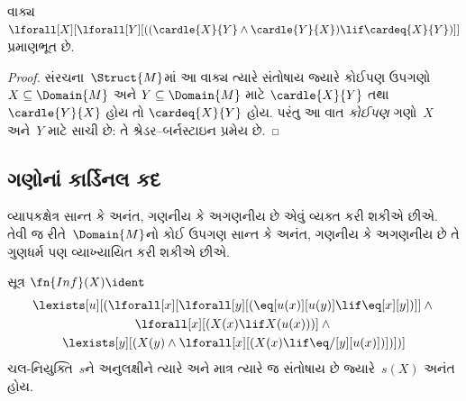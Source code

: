 \begin{prop}
વાક્ય~$\lforall[X][\lforall[Y][((\cardle{X}{Y} \land
    \cardle{Y}{X}) \lif \cardeq{X}{Y})]]$ પ્રમાણભૂત છે.
\end{prop}

\begin{proof}
સંરચના~$\Struct{M}$માં આ વાક્ય ત્યારે સંતોષાય જ્યારે
કોઈપણ ઉપગણો $X \subseteq \Domain{M}$ અને $Y \subseteq
\Domain{M}$ માટે $\cardle{X}{Y}$ તથા $\cardle{Y}{X}$ હોય તો
$\cardeq{X}{Y}$ હોય. પરંતુ આ વાત \emph{કોઈપણ} ગણો~$X$ અને~$Y$
માટે સાચી છે: તે શ્રેડર--બર્નસ્ટાઇન પ્રમેય છે.
\end{proof}






\subsection{ગણોનાં કાર્ડિનલ કદ}\label{sol:set:crd:sec}

\begin{explain}
વ્યાપકક્ષેત્ર સાન્ત કે અનંત, ગણનીય કે અગણનીય
છે એવું વ્યક્ત કરી શકીએ છીએ. તેવી જ રીતે~$\Domain{M}$નો કોઈ ઉપગણ
સાન્ત કે અનંત, ગણનીય કે અગણનીય છે તે ગુણધર્મ
પણ વ્યાખ્યાયિત કરી શકીએ છીએ.
\end{explain}

\begin{prop}
સૂત્ર $\fn{Inf}(X) \ident$
\begin{multline*}
\lexists[u][(\lforall[x][\lforall[y][(\eq[u(x)][u(y)] \lif
      \eq[x][y])]] \land {} \\
\lforall[x][(X(x) \lif X(u(x)))] \land {} \\
\lexists[y][(X(y) \land \lforall[x][(X(x)
      \lif \eq/[y][u(x)])])])]
\end{multline*}
ચલ-નિયુક્તિ~$s$ને અનુલક્ષીને ત્યારે અને માત્ર ત્યારે જ સંતોષાય છે
જ્યારે~$s(X)$ અનંત હોય.
\end{prop}

